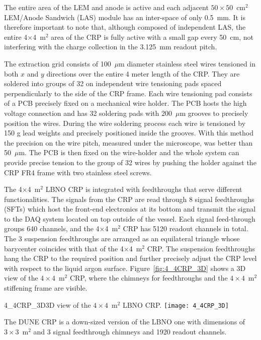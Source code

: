 The entire area of the LEM and anode is active and each adjacent
$50\times50$~cm$^2$ LEM/Anode Sandwich (LAS) module has an inter-space
of only 0.5~mm. It is therefore important to note that, although
composed of independent LAS, the entire 4$\times$4~m$^2$ area of the
CRP is fully active with a small gap every 50~cm, not interfering with
the charge collection in the 3.125~mm readout pitch.

The extraction grid consists of 100~$\mu$m diameter stainless steel
wires tensioned in both $x$ and $y$ directions over the entire 4 meter
length of the CRP. They are soldered into groups of 32 on independent
wire tensioning pads spaced perpendicularly to the side of the CRP
frame. Each wire tensioning pad consists of a PCB precisely fixed on a
mechanical wire holder. The PCB hosts the high voltage connection and
has 32 soldering pads with 200~$\mu$m grooves to precisely position
the wires. During the wire soldering process each wire is tensioned by
150 g lead weights and precisely positioned inside the grooves. With
this method the precision on the wire pitch, measured under the
microscope, was better than 50~$\mu$m. The PCB is then fixed on the
wire-holder and the whole system can provide precise tension to the
group of 32 wires by pushing the holder against the CRP FR4 frame with
two stainless steel screws.

The 4$\times$4~m$^2$ LBNO CRP is integrated with feedthroughs that
serve different functionalities. The signals from the CRP are read
through 8 signal feedthroughs (SFTs) which host the front-end
electronics at its bottom and transmit the signal to the DAQ system
located on top outside of the vessel.  Each signal feed-through groups
640 channels, and the 4$\times$4~m$^2$ CRP has 5120 readout channels
in total.  The 3 suspension feedthroughs are arranged as an
equilateral triangle whose barycenter coincides with that of the
4$\times$4~m$^2$ CRP.  The suspension feedthroughs hang the CRP to the
required position and further precisely adjust the CRP level with
respect to the liquid argon surface. Figure~\ref{fig:4_4CRP_3D} shows
a 3D view of the $4\times4$~m$^2$ CRP, where the chimneys for
feedthroughs and the $4\times4$~m$^2$ stiffening frame are visible.
\begin{cdrfigure}{4_4CRP_3D}{3D view of the $4\times4$~m$^2$ LBNO CRP.}
\texttt{[image: 4\_4CRP\_3D]}  
\end{cdrfigure}

The DUNE CRP is a down-sized version of the LBNO one with dimensions
of $3\times3$~m$^2$ and 3 signal feedthrough chimneys and 1920 readout
channels.

